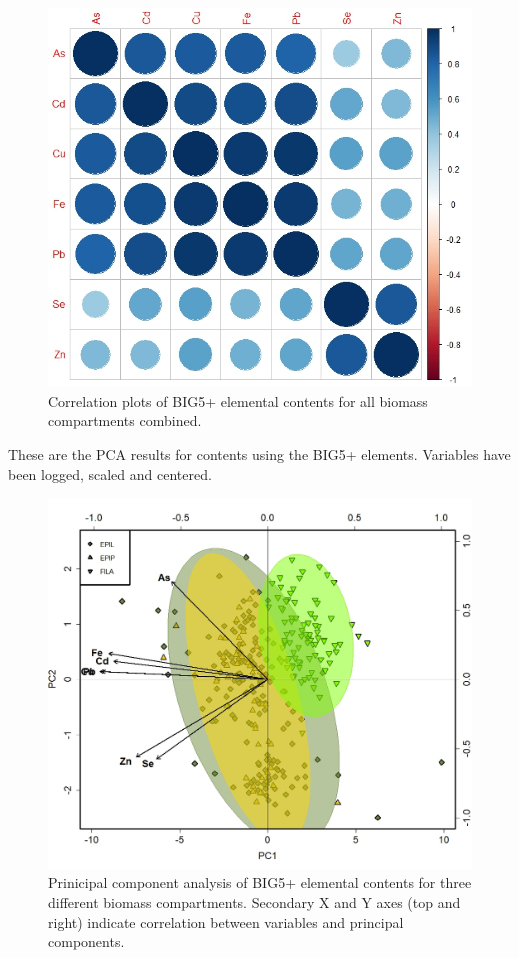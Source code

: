 \documentclass[
]{article}
\begin{document}
\begin{figure}
\includegraphics[width=1\linewidth]{Figures/CORRPLOT_1_BIG5PLUS} \caption[Correlation plots of BIG5+ elemental contents for all biomass compartments combined]{Correlation plots of BIG5+ elemental contents for all biomass compartments combined.}\label{fig:unnamed-chunk-8}
\end{figure}

\FloatBarrier

\newpage

These are the PCA results for contents using the BIG5+ elements.
Variables have been logged, scaled and centered.

\begin{figure}
\includegraphics[width=1\linewidth]{Figures/PCA_1_BIG5PLUS} \caption[Prinicipal component analysis of BIG5+ elemental contents for three different biomass compartments]{Prinicipal component analysis of BIG5+ elemental contents for three different biomass compartments. Secondary X and Y axes (top and right) indicate correlation between variables and principal components.}\label{fig:unnamed-chunk-9}
\end{figure}
\end{document}

